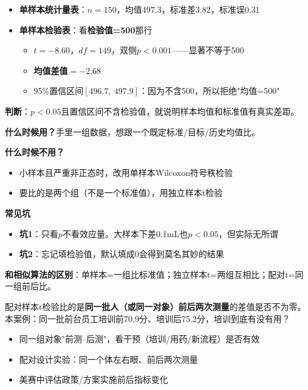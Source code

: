 \begin{algoresult}
\begin{itemize}
    \item \textbf{单样本统计量表}：$n=150$，均值497.3，标准差3.82，标准误0.31
    \item \textbf{单样本检验表}：看\textbf{检验值=500}那行
    \begin{itemize}
        \item $t=-8.60$，$df=149$，双侧$p<0.001$——显著不等于500
        \item \textbf{均值差值}$=-2.68$
        \item 95\%置信区间$[496.7,\ 497.9]$：因为不含500，所以拒绝"均值=500"
    \end{itemize}
\end{itemize}

\textbf{判断}：$p<0.05$且置信区间不含检验值，就说明样本均值和标准值有真实差距。
\end{algoresult}

\begin{algonotes}
\textbf{什么时候用？}手里一组数据，想跟一个既定标准/目标/历史均值比。

\textbf{什么时候不用？}
\begin{itemize}
    \item 小样本且严重非正态时，改用单样本Wilcoxon符号秩检验
    \item 要比的是两个组（不是一个标准值），用独立样本t检验
\end{itemize}

\textbf{常见坑}
\begin{itemize}
    \item \textbf{坑1}：只看$p$不看效应量。大样本下差0.1mL也$p<0.05$，但实际无所谓
    \item \textbf{坑2}：忘记填检验值，默认填成0会得到莫名其妙的结果
\end{itemize}

\textbf{和相似算法的区别}：单样本=一组比标准值；独立样本t=两组互相比；配对t=同一组前后比。
\end{algonotes}


\begin{algointro}
配对样本t检验比的是\textbf{同一批人（或同一对象）前后两次测量}的差值是否不为零。本案例：同一批前台员工培训前70.9分、培训后75.2分，培训到底有没有用？
\end{algointro}

\begin{algoscene}
\begin{itemize}
    \item 同一组对象"前测--后测"，看干预（培训/用药/新流程）是否有效
    \item 配对设计实验：同一个体左右眼、前后两次测量
    \item 美赛中评估政策/方案实施前后指标变化
\end{itemize}
\end{algoscene}

